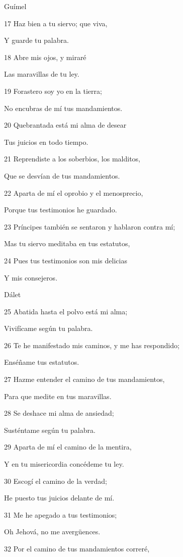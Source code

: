 \par Guímel
\par 17 Haz bien a tu siervo; que viva,
\par Y guarde tu palabra.
\par 18 Abre mis ojos, y miraré
\par Las maravillas de tu ley.
\par 19 Forastero soy yo en la tierra;
\par No encubras de mí tus mandamientos.
\par 20 Quebrantada está mi alma de desear
\par Tus juicios en todo tiempo.
\par 21 Reprendiste a los soberbios, los malditos,
\par Que se desvían de tus mandamientos.
\par 22 Aparta de mí el oprobio y el menosprecio,
\par Porque tus testimonios he guardado.
\par 23 Príncipes también se sentaron y hablaron contra mí;
\par Mas tu siervo meditaba en tus estatutos,
\par 24 Pues tus testimonios son mis delicias
\par Y mis consejeros.
\par Dálet
\par 25 Abatida hasta el polvo está mi alma;
\par Vivifícame según tu palabra.
\par 26 Te he manifestado mis caminos, y me has respondido;
\par Enséñame tus estatutos.
\par 27 Hazme entender el camino de tus mandamientos,
\par Para que medite en tus maravillas.
\par 28 Se deshace mi alma de ansiedad;
\par Susténtame según tu palabra.
\par 29 Aparta de mí el camino de la mentira,
\par Y en tu misericordia concédeme tu ley.
\par 30 Escogí el camino de la verdad;
\par He puesto tus juicios delante de mí.
\par 31 Me he apegado a tus testimonios;
\par Oh Jehová, no me avergüences.
\par 32 Por el camino de tus mandamientos correré,

